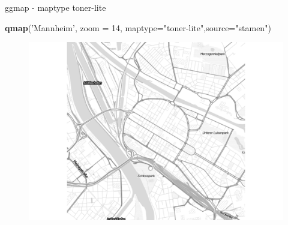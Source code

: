 \documentclass[ignorenonframetext,]{beamer}
\newenvironment{Shaded}{}{}
\newcommand{\KeywordTok}[1]{\textcolor[rgb]{0.00,0.44,0.13}{\textbf{{#1}}}}
\newcommand{\DataTypeTok}[1]{\textcolor[rgb]{0.56,0.13,0.00}{{#1}}}
\newcommand{\DecValTok}[1]{\textcolor[rgb]{0.25,0.63,0.44}{{#1}}}
\newcommand{\StringTok}[1]{\textcolor[rgb]{0.25,0.44,0.63}{{#1}}}
\newcommand{\NormalTok}[1]{{#1}}
\begin{document}
\begin{frame}[fragile]{ggmap - maptype toner-lite}

\begin{Shaded}
\begin{Highlighting}[]
\KeywordTok{qmap}\NormalTok{(}\StringTok{'Mannheim'}\NormalTok{, }\DataTypeTok{zoom =} \DecValTok{14}\NormalTok{,}
 \DataTypeTok{maptype=}\StringTok{"toner-lite"}\NormalTok{,}\DataTypeTok{source=}\StringTok{"stamen"}\NormalTok{)}
\end{Highlighting}
\end{Shaded}

\begin{figure}[htbp]
\centering
\includegraphics{RSocialScience2_files/figure-beamer/unnamed-chunk-43-1.pdf}
\caption{}
\end{figure}

\end{frame}
\end{document}
